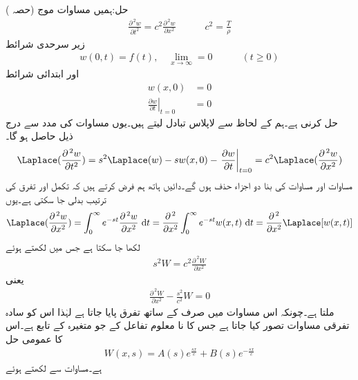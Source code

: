 حل:\quad ہمیں مساوات موج (حصہ )
\begin{align}\label{مساوات_نصف_لامتناہی_تار_مثال_الف}
\frac{\partial^{\,2}w}{\partial t^2}=c^2\frac{\partial^{\,2}w}{\partial x^2}\quad \quad \quad c^2=\frac{T}{\rho}
\end{align}
زیر سرحدی شرائط
\begin{align}\label{مساوات_نصف_لامتناہی_تار_مثال_ب}
w(0,t)=f(t),\quad \lim_{x\to\infty}=0\quad \quad \quad (t\ge 0)
\end{align}
اور ابتدائی شرائط 
\begin{align}
w(x,0)&=0\label{مساوات_نصف_لامتناہی_تار_مثال_پ}\\
\left.\frac{\partial w}{\partial t} \right|_{t=0}&=0\label{مساوات_نصف_لامتناہی_تار_مثال_ت}
\end{align}
 حل کرنی ہے۔ہم  کے لحاظ سے لاپلاس تبادل لیتے ہیں۔یوں مساوات  کی مدد سے درج ذیل حاصل ہو گا۔
\begin{align*}
\Laplace(\frac{\partial^{\,2}w}{\partial t^2})=s^2\Laplace(w)-sw(x,0)-\left.\frac{\partial w}{\partial t}\right|_{t=0}=c^2\Laplace(\frac{\partial^{\,2}w}{\partial x^2})
\end{align*}
مساوات  اور مساوات  کی بنا دو اجزاء حذف ہوں گے۔دائیں ہاتھ ہم فرض کرتے ہیں کہ تکمل اور تفرق کی ترتیب بدلی جا سکتی ہے۔یوں
\begin{align*}
\Laplace(\frac{\partial^{\,2}w}{\partial x^2})=\int_0^{\infty} e^{-st}\frac{\partial^{\,2}w}{\partial x^2}\,\dif t=\frac{\partial^{\,2}}{\partial x^2}\int_0^{\infty}e^{-st}w(x,t)\,\dif t=\frac{\partial^{\,2}}{\partial x^2}\Laplace[w(x,t)]
\end{align*}
لکھا جا سکتا ہے جس میں  لکھتے ہوئے
\begin{align*}
s^2W=c^2\frac{\partial^{\,2}W}{\partial x^2}
\end{align*}
یعنی
\begin{align*}
\frac{\partial^{\,2}W}{\partial x^2}-\frac{s^2}{c^2}W=0
\end{align*}
ملتا ہے۔چونکہ اس مساوات میں صرف  کے ساتھ تفرق پایا جاتا ہے لہٰذا اس کو سادہ تفرقی مساوات تصور کیا جاتا ہے جس کا نا معلوم تفاعل  کے جو متغیرہ  کے تابع ہے۔اس کا عمومی حل
\begin{align}\label{مساوات_نصف_لامتناہی_تار_مثال_ٹ}
W(x,s)=A(s)e^{\frac{sx}{c}}+B(s)e^{-\frac{sx}{c}}
\end{align}
ہے۔مساوات  سے  لکھتے ہوئے
